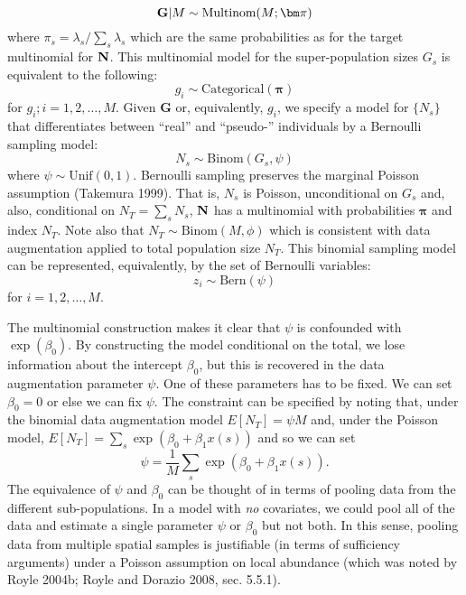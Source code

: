 \begin{equation}
{\bf G}|M \sim \mbox{Multinom}(M;  {\bm \pi} ) 
\label{eq.mn1}
\end{equation}
where $\pi_{s} = \lambda_{s}/\sum_{s} \lambda_{s}$ which are the same
probabilities as for the target multinomial for ${\bf N}$. 
This multinomial model for the super-population sizes $G_{s}$ is
equivalent to the following:
\[
 g_{i} \sim \mbox{Categorical}({\bm \pi} )
\]
for $g_{i}; i=1,2,\ldots, M$.  Given {\bf G} or, equivalently,
$g_{i}$, we specify a model for $\{ N_{s}\}$ that differentiates
between ``real'' and ``pseudo-'' individuals by a Bernoulli sampling
model:
\[
 N_{s} \sim \mbox{Binom}(G_{s} , \psi)
\]
where $\psi \sim \mbox{Unif}(0,1)$. Bernoulli sampling preserves the
marginal Poisson assumption (Takemura 1999). That is, $N_{s}$ is
Poisson, unconditional on $G_{s}$ and, also, 
conditional on $N_{T} = \sum_{s} N_{s}$, ${\bf N}$ has a multinomial
with probabilities ${\bm \pi}$ and index $N_{T}$.  Note also that
$N_{T} \sim \mbox{Binom}(M, \phi)$ which is consistent with data
augmentation applied to total population size $N_{T}$. This binomial
sampling model can be represented, equivalently, by the set of
Bernoulli variables:
\[
 z_{i} \sim \mbox{Bern}(\psi)
\]
for $i=1,2,\ldots,M$.

The multinomial construction makes it clear that $\psi$ is confounded
with $\exp(\beta_{0})$. By constructing the model conditional on the
total, we lose information about the intercept $\beta_{0}$, but this
is recovered in the data augmentation parameter $\psi$.  One of these
parameters has to be fixed. We can set $\beta_0 = 0$ or else we can
fix $\psi$.  The constraint can be specified by noting that, under the
binomial data augmentation model $E[N_{T}] = \psi M$ and, under the
Poisson model, $E[N_{T}] = \sum_{s} \exp(\beta_{0} + \beta_{1} x(s))$
and so we can set
\[
 \psi = \frac{1}{M} \sum_{s} \exp(\beta_{0} + \beta_{1} x(s)).
\]
The equivalence of $\psi$ and $\beta_{0}$ can be thought of in terms of pooling data
from the different sub-populations. In a model with {\it no} covariates, 
we could pool 
all of the data and estimate a single parameter $\psi$ or $\beta_0$ but not
both. In this sense, 
 pooling data from multiple spatial samples is justifiable (in terms of
sufficiency arguments) under a Poisson assumption on local abundance
(which was noted by Royle 2004b; Royle and Dorazio 2008, sec. 5.5.1).


